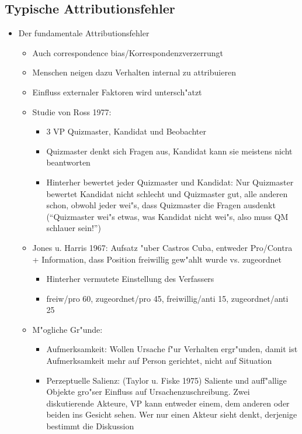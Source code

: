\subsection{Typische Attributionsfehler}
\begin{itemize}
	\item
		Der fundamentale Attributionsfehler
		\begin{itemize}
			\item
				Auch correspondence bias/Korrespondenzverzerrungt
			\item
				Menschen neigen dazu Verhalten internal zu attribuieren
			\item
				Einfluss externaler Faktoren wird untersch"atzt
			\item
				Studie von Ross 1977:
				\begin{itemize}
					\item
						3 VP Quizmaster, Kandidat und Beobachter
					\item
						Quizmaster denkt sich Fragen aus, Kandidat kann sie meistens nicht beantworten
					\item
						Hinterher bewertet jeder Quizmaster und Kandidat: Nur Quizmaster bewertet Kandidat nicht schlecht und Quizmaster gut, alle anderen schon, obwohl jeder wei"s, dass Quizmaster die Fragen ausdenkt (\enquote{Quizmaster wei"s etwas, was Kandidat nicht wei"s, also muss QM schlauer sein!})
				\end{itemize}
			\item
				Jones u. Harris 1967: Aufsatz "uber Castros Cuba, entweder Pro/Contra + Information, dass Position freiwillig gew"ahlt wurde vs. zugeordnet
				\begin{itemize}
					\item
						Hinterher vermutete Einstellung des Verfassers
					\item
						freiw/pro 60, zugeordnet/pro 45, freiwillig/anti 15, zugeordnet/anti 25
				\end{itemize}
			\item
				M"ogliche Gr"unde:
				\begin{itemize}
					\item
						Aufmerksamkeit: Wollen Ursache f"ur Verhalten ergr"unden, damit ist Aufmerksamkeit mehr auf Person gerichtet, nicht auf Situation
					\item
						Perzeptuelle Salienz: (Taylor u. Fiske 1975) Saliente und auff"allige Objekte gro"ser Einfluss auf Ursachenzuschreibung. Zwei diskutierende Akteure, VP kann entweder einem, dem anderen oder beiden ins Gesicht sehen. Wer nur einen Akteur sieht denkt, derjenige bestimmt die Diskussion

\end{itemize}
\end{itemize}
\end{itemize}
